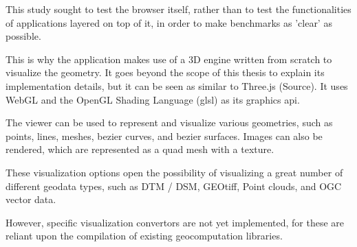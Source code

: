 This study sought to test the browser itself, rather than to test the functionalities of applications layered on top of it, in order to make benchmarks as 'clear' as possible. 

This is why the application makes use of a 3D engine written from scratch to visualize the geometry. 
It goes beyond the scope of this thesis to explain its implementation details, but it can be seen as similar to Three.js (Source).
It uses WebGL and the OpenGL Shading Language (glsl) as its graphics api. 

The viewer can be used to represent and visualize various geometries, such as points, lines, meshes, bezier curves, and bezier surfaces.
Images can also be rendered, which are represented as a quad mesh with a texture. 

These visualization options open the possibility of visualizing a great number of different geodata types, such as DTM / DSM, GEOtiff, Point clouds, and OGC vector data. 

However, specific visualization convertors are not yet implemented, for these are reliant upon the compilation of existing geocomputation libraries. 

